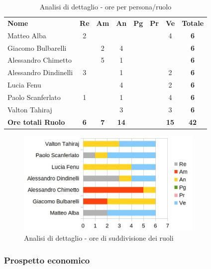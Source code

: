 		\begin{table} [h!]
			\begin{center}
				\begin{tabular} { m{3.5cm} c c c c c c c }
					\rowcolor{lightgray}
					\textbf{Nome} & \textbf{Re} & \textbf{Am} & \textbf{An} & \textbf{Pg} & \textbf{Pr} & \textbf{Ve} & \textbf{Totale} \\
					Matteo Alba & 2 & & & & & 4 & \textbf{6} \\
					Giacomo Bulbarelli & & 2 & 4 & & & & \textbf{6} \\
					Alessandro Chimetto & & 5 & 1 & & & & \textbf{6} \\
					Alessandro Dindinelli & 3 & & 1 & & & 2 & \textbf{6} \\
					Lucia Fenu & & & 4 & & & 2 & \textbf{6} \\
					Paolo Scanferlato & 1 & & 1 & & & 4 & \textbf{6} \\
					Valton Tahiraj & & & 3 & & & 3 & \textbf{6} \\
					\textbf{Ore totali Ruolo} & \textbf{6} & \textbf{7} & \textbf{14} & \textbf{} & \textbf{}& \textbf{15} & \textbf{42}
				\end{tabular}
				\caption{Analisi di dettaglio - ore per persona/ruolo}
			\end{center}
		\end{table}
	
		\begin{figure} [h!]
			\centering
			\includegraphics[width=0.8\textwidth]{res/img/grafici/consolidamento_dei_requisiti_ore_ruolo.jpg}
			\caption{Analisi di dettaglio - ore di suddivisione dei ruoli} 
		\end{figure}
		
	\newpage

	\subsubsection{Prospetto economico}
	
